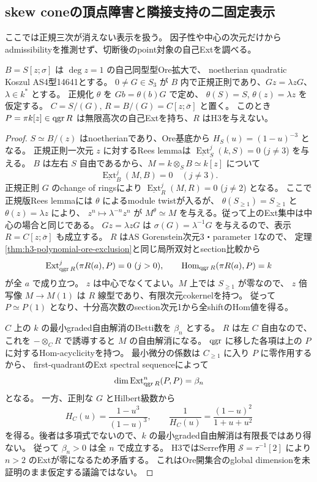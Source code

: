 \subsection{skew coneの頂点障害と隣接支持の二固定表示}
\label{subsec:cubic-as4-adjacent-L}
ここでは正規三次が消えない表示を扱う。
因子性や中心の次元だけからadmissibilityを推測せず、切断後のpoint対象の自己Extを調べる。

\begin{lemma}\label{lem:cubic-skew-cone-vertex}
$B=S[z;\sigma]$ は $\deg z=1$ の自己同型型Ore拡大で、
noetherian quadratic Koszul AS4型14641とする。
$0\ne G\in S_3$ が $B$ 内で正規正則であり、$Gz=\lambda zG$、$\lambda\in k^*$ とする。
正規化 $\theta$ を $Gb=\theta(b)G$ で定め、
$\theta(S)=S$, $\theta(z)=\lambda z$ を仮定する。
$C=S/(G)$, $R=B/(G)=C[z;\bar\sigma]$ と置く。
このとき $P=\pi k[z]\in\operatorname{qgr} R$ は無限高次の自己Extを持ち、$R$ はH3を与えない。
\end{lemma}
\begin{proof}
$S\simeq B/(z)$ はnoetherianであり、Ore基底から
$H_S(u)=(1-u)^{-3}$ となる。
正規正則一次元 $z$ に対するRees lemmaは
$\underline{\operatorname{Ext}}_S^j(k,S)=0$ ($j\ne3$) を与える。
$B$ は左右 $S$ 自由であるから、$M=k\otimes_SB\simeq k[z]$ について
\[
 \underline{\operatorname{Ext}}_B^j(M,B)=0\quad(j\ne3).
\]
正規正則 $G$ のchange of ringsにより
$\underline{\operatorname{Ext}}_R^j(M,R)=0$ ($j\ne2$) となる。
ここで正規版Rees lemmaには $\theta$ によるmodule twistが入るが、
$\theta(S_{\ge1})=S_{\ge1}$ と $\theta(z)=\lambda z$ により、
$z^n\mapsto\lambda^{-n}z^n$ が $M^\theta\simeq M$ を与える。従って上のExt集中は中心の場合と同じである。
$Gz=\lambda zG$ は $\sigma(G)=\lambda^{-1}G$ を与えるので、表示
$R=C[z;\bar\sigma]$ も成立する。
$R$ はAS Gorenstein次元3・parameter 1なので、
定理\ref{thm:h3-polynomial-ore-exclusion}と同じ局所双対とsection比較から
\[
 \operatorname{Ext}^j_{\operatorname{qgr} R}(\pi R(a),P)=0\ (j>0),\qquad
 \operatorname{Hom}_{\operatorname{qgr} R}(\pi R(a),P)=k
\]
が全 $a$ で成り立つ。
$z$ は中心でなくてよい。$M$ 上では $S_{\ge1}$ が零なので、
$z$ 倍写像 $M\to M(1)$ は $R$ 線型であり、有限次元cokernelを持つ。
従って $P\simeq P(1)$ となり、十分高次数のsection次元1から全shiftのHom値を得る。

$C$ 上の $k$ の最小graded自由解消のBetti数を $\beta_n$ とする。
$R$ は左 $C$ 自由なので、これを $-\otimes_CR$ で誘導すると $M$ の自由解消になる。
$\operatorname{qgr}$ に移した各項は上の $P$ に対するHom-acyclicityを持つ。
最小微分の係数は $C_{\ge1}$ に入り $P$ に零作用するから、
first-quadrantのExt spectral sequenceによって
\[
 \dim\operatorname{Ext}^n_{\operatorname{qgr} R}(P,P)=\beta_n
\]
となる。
一方、正則な $G$ とHilbert級数から
\[
 H_C(u)=\frac{1-u^3}{(1-u)^3},\qquad
 \frac1{H_C(u)}=\frac{(1-u)^2}{1+u+u^2}
\]
を得る。後者は多項式でないので、$k$ の最小graded自由解消は有限長ではあり得ない。
従って $\beta_n>0$ は全 $n$ で成立する。
H3ではSerre作用 $\mathcal S=\tau^{-1}[2]$ により $n>2$ のExtが零になるため矛盾する。
これはOre開集合のglobal dimensionを未証明のまま仮定する議論ではない。
\end{proof}


